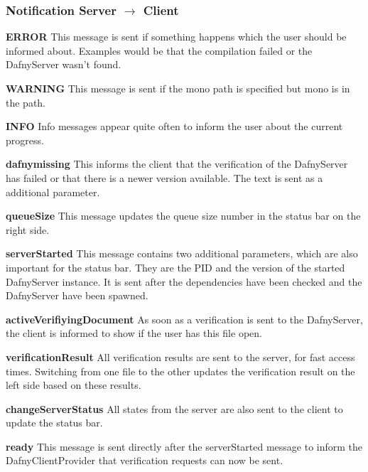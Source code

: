 \subsubsection{Notification Server $\longrightarrow$ Client}

\textbf{ERROR}
This message is sent if something happens which the user should be informed about. Examples would be that the compilation failed or the DafnyServer wasn't found. \newline

\textbf{WARNING}
This message is sent if the mono path is specified but mono is in the path. \newline

\textbf{INFO}
Info messages appear quite often to inform the user about the current progress. \newline

\textbf{dafnymissing}
This informs the client that the verification of the DafnyServer has failed or that there is a newer version available. The text is sent as a additional parameter.  \newline

\textbf{queueSize}
This message updates the queue size number in the status bar on the right side. \newline

\textbf{serverStarted}
This message contains two additional parameters, which are also important for the status bar. They are the PID and the version of the started DafnyServer instance. It is sent after the dependencies have been checked and the DafnyServer have been spawned. \newline

\textbf{activeVerifiyingDocument}
As soon as a verification is sent to the DafnyServer, the client is informed to show if the user has this file open. \newline

\textbf{verificationResult}
All verification results are sent to the server, for fast access times. Switching from one file to the other updates the verification result on the left side based on these results. \newline

\textbf{changeServerStatus}
All states from the server are also sent to the client to update the status bar. \newline

\textbf{ready}
This message is sent directly after the serverStarted message to inform the DafnyClientProvider that verification requests can now be sent. \newline

